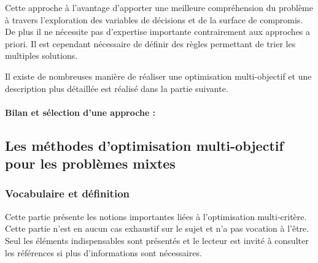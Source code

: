
Cette approche à l’avantage d’apporter une meilleure compréhension du problème à
travers l’exploration des variables de décisions et de la surface de compromis.
De plus il ne nécessite pas d’expertise importante contrairement aux approches a priori.
Il est cependant nécessaire de définir des règles permettant de trier les multiples solutions.

Il existe de nombreuses manière de réaliser une optimisation multi-objectif et une
description plus détaillée est réalisé dans la partie suivante.

\paragraph{Bilan et sélection d’une approche :} %
\label{par:bilan_et_selection_d_une_approche}




\subsection{Les méthodes d’optimisation multi-objectif pour les problèmes mixtes} %
\label{sub:les_methodes_d_optimisation_multi_objectif_pour_les_probleme_mixtes}
\subsubsection{Vocabulaire et définition} %
\label{ssub:vocabulaire_et_definition}
Cette partie présente les notions importantes liées à l’optimisation multi-critère.
Cette partie n’est en aucun cas exhaustif sur le sujet et n’a pas vocation à l’être.
Seul les éléments indispensables sont présentés et le lecteur est invité à consulter
les références si plus d’informations sont nécessaires.


